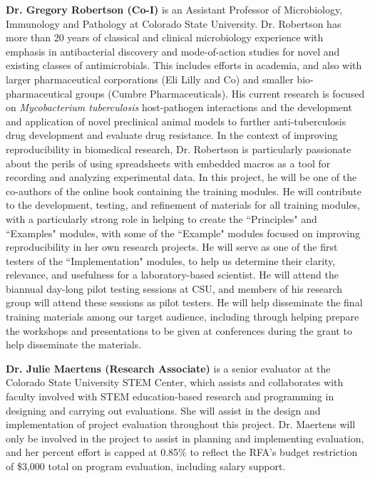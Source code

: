 \documentclass[pdftex,english,11pt,parskip=half]{scrartcl}
\begin{document}
\noindent \textbf{Dr. Gregory Robertson (Co-I)} is an Assistant Professor of
Microbiology, Immunology and Pathology at Colorado State University. Dr.
Robertson has more than 20 years of classical and clinical microbiology
experience with emphasis in antibacterial discovery and mode-of-action studies
for novel and existing classes of antimicrobials. This includes efforts in
academia, and also with larger pharmaceutical corporations (Eli Lilly and Co)
and smaller bio-pharmaceutical groups (Cumbre Pharmaceuticals). His current
research is focused on \textit{Mycobacterium tuberculosis} host-pathogen
interactions and the development and application of novel preclinical animal
models to further anti-tuberculosis drug development and evaluate drug
resistance. In the context of improving reproducibility in biomedical research,
Dr. Robertson is particularly passionate about the perils of using spreadsheets
with embedded macros as a tool for recording and analyzing experimental data. In
this project, he will be one of the co-authors of the online book containing the
training modules. He will contribute to the development, testing, and refinement
of materials for all training modules, with a particularly strong role in
helping to create the ``Principles" and ``Examples" modules, with some of the
``Example" modules focused on improving reproducibility in her own research
projects. He will serve as one of the first testers of the ``Implementation"
modules, to help us determine their clarity, relevance, and usefulness for a
laboratory-based scientist. He will attend the biannual day-long pilot testing
sessions at CSU, and members of his research group will attend these sessions as
pilot testers. He will help disseminate the final training materials among our
target audience, including through helping prepare the workshops and
presentations to be given at conferences during the grant to help disseminate
the materials. 

\noindent \textbf{Dr. Julie Maertens (Research Associate)} is a senior evaluator
at the Colorado State University STEM Center, which assists and collaborates
with faculty involved with STEM education-based research and programming in
designing and carrying out evaluations. She will assist in the design and
implementation of project evaluation throughout this project. Dr. Maertens will
only be involved in the project to assist in planning and implementing
evaluation, and her percent effort is capped at 0.85\% to reflect the RFA's
budget restriction of \$3,000 total on program evaluation, including salary
support.
\end{document}

